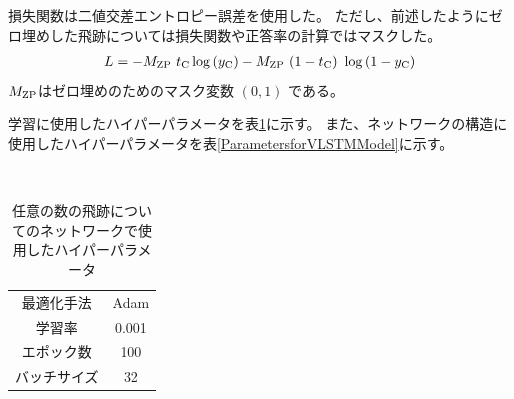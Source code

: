 損失関数は二値交差エントロピー誤差を使用した。
ただし、前述したようにゼロ埋めした飛跡については損失関数や正答率の計算ではマスクした。
\begin{equation}
 \begin{split}
 L = -M_{\rm ZP}\ t_{\rm C} \log{(y_{\rm C})} - M_{\rm ZP}\ (1-t_{\rm C})\ \log{(1-y_{\rm C})}
 \end{split}
\end{equation}
$M_{\rm ZP}$はゼロ埋めのためのマスク変数 $(0, 1)$ である。

学習に使用したハイパーパラメータを表\ref{HyperparametersforVLSTMModel}に示す。
また、ネットワークの構造に使用したハイパーパラメータを表\ref{ParametersforVLSTMModel}に示す。

\begin{table}[htb]
 \centering
　\small
  \begin{tabular}{c c}\hline\hline
    最適化手法 & Adam\\
    学習率 & 0.001\\
    エポック数 & 100\\
    バッチサイズ & 32\\\hline\hline
  \end{tabular}
  \caption{任意の数の飛跡についてのネットワークで使用したハイパーパラメータ}
  \label{HyperparametersforVLSTMModel}
\end{table}


